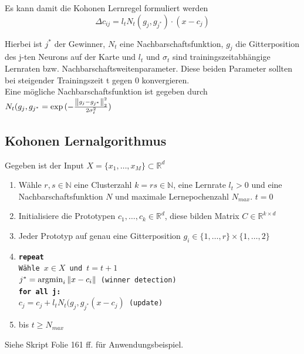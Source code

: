 Es kann damit die Kohonen Lernregel formuliert werden
\begin{equation*}
    \Delta c_{ij} = l_t N_t(g_j,g_{j^*})\cdot(x-c_j)
\end{equation*}

Hierbei ist $j^*$ der Gewinner, $N_t$ eine Nachbarschaftsfunktion, $g_j$ die Gitterposition des j-ten Neurons auf der Karte und $l_t$ und $\sigma_t$ sind trainingszeitabhängige Lernraten bzw. Nachbarschaftsweitenparameter. Diese beiden Parameter sollten bei steigender Trainingszeit t gegen $0$ konvergieren.\\
Eine mögliche Nachbarschaftsfunktion ist gegeben durch $N_t(g_j,g_{j^*} = \exp{(-\frac{\left\lVert g_j-g_{j^*}\right\rVert_2^2}{2\sigma_t^2})}$

\subsection{Kohonen Lernalgorithmus}
Gegeben ist der Input $X = \{x_1,\dots,x_M\}\subset \mathbb{R}^d$

\begin{enumerate}
        \item Wähle $r,s\in\mathbb{N}$ eine Clusterzahl $k=rs\in\mathbb{N}$, eine Lernrate $l_t>0$ und eine Nachbarschaftsfunktion $N$ und maximale Lernepochenzahl $N_{max}$. $t=0$
        \item Initialisiere die Prototypen $c_1,\dots,c_k \in\mathbb{R}^d$, diese bilden Matrix $C\in\mathbb{R}^{k\times d}$
        \item Jeder Prototyp auf genau eine Gitterposition $g_i \in \{1,\dots,r\}\times\{1,\dots,2\}$
        \item \texttt{\textbf{repeat}\\
            Wähle $x\in X$ und $t=t+1$\\
            $j^* = \operatorname{argmin}_i\left\lVert x-c_i\right\rVert$ (winner detection)\\
            \textbf{for all j:}\\
            $c_j = c_j + l_tN_t(g_j,g_{j^*}(x-c_j)$ (update)}
        \item bis $t\geq N_{max}$    
\end{enumerate}
Siehe Skript Folie 161 ff. für Anwendungsbeispiel.


